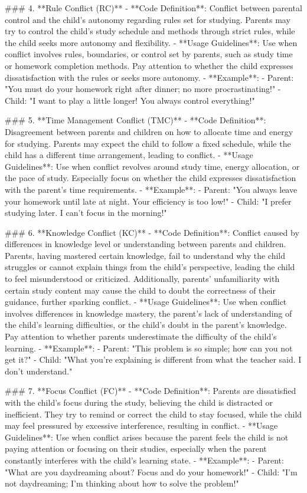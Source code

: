 \begin{spverbatim}
### 4. **Rule Conflict (RC)**
- **Code Definition**: Conflict between parental control and the child's autonomy regarding rules set for studying. Parents may try to control the child's study schedule and methods through strict rules, while the child seeks more autonomy and flexibility.
- **Usage Guidelines**: Use when conflict involves rules, boundaries, or control set by parents, such as study time or homework completion methods. Pay attention to whether the child expresses dissatisfaction with the rules or seeks more autonomy.
- **Example**:  
  - Parent: "You must do your homework right after dinner; no more procrastinating!"
  - Child: "I want to play a little longer! You always control everything!"

### 5. **Time Management Conflict (TMC)**
- **Code Definition**: Disagreement between parents and children on how to allocate time and energy for studying. Parents may expect the child to follow a fixed schedule, while the child has a different time arrangement, leading to conflict.
- **Usage Guidelines**: Use when conflict revolves around study time, energy allocation, or the pace of study. Especially focus on whether the child expresses dissatisfaction with the parent's time requirements.
- **Example**:  
  - Parent: "You always leave your homework until late at night. Your efficiency is too low!"
  - Child: "I prefer studying later. I can't focus in the morning!"

### 6. **Knowledge Conflict (KC)**
- **Code Definition**: Conflict caused by differences in knowledge level or understanding between parents and children. Parents, having mastered certain knowledge, fail to understand why the child struggles or cannot explain things from the child’s perspective, leading the child to feel misunderstood or criticized. Additionally, parents' unfamiliarity with certain study content may cause the child to doubt the correctness of their guidance, further sparking conflict.
- **Usage Guidelines**: Use when conflict involves differences in knowledge mastery, the parent's lack of understanding of the child's learning difficulties, or the child's doubt in the parent's knowledge. Pay attention to whether parents underestimate the difficulty of the child's learning.
- **Example**:  
  - Parent: "This problem is so simple; how can you not get it?"
  - Child: "What you’re explaining is different from what the teacher said. I don’t understand."

### 7. **Focus Conflict (FC)**
- **Code Definition**: Parents are dissatisfied with the child's focus during the study, believing the child is distracted or inefficient. They try to remind or correct the child to stay focused, while the child may feel pressured by excessive interference, resulting in conflict.
- **Usage Guidelines**: Use when conflict arises because the parent feels the child is not paying attention or focusing on their studies, especially when the parent constantly interferes with the child's learning state.
- **Example**:  
  - Parent: "What are you daydreaming about? Focus and do your homework!"
  - Child: "I'm not daydreaming; I'm thinking about how to solve the problem!"


\end{spverbatim}
